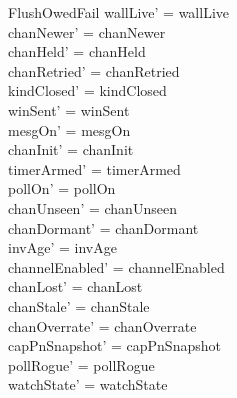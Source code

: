 \documentclass[a4paper,10pt,fleqn]{article}
\begin{document}
\begin{schema}{FlushOwedFail}
  wallLive' = wallLive \\
  chanNewer' = chanNewer \\
  chanHeld' = chanHeld \\
  chanRetried' = chanRetried \\
  kindClosed' = kindClosed \\
  winSent' = winSent \\
  mesgOn' = mesgOn \\
  chanInit' = chanInit \\
  timerArmed' = timerArmed \\
  pollOn' = pollOn \\
  chanUnseen' = chanUnseen \\
  chanDormant' = chanDormant \\
  invAge' = invAge \\
  channelEnabled' = channelEnabled \\
  chanLost' = chanLost \\
  chanStale' = chanStale \\
  chanOverrate' = chanOverrate \\
  capPnSnapshot' = capPnSnapshot \\
  pollRogue' = pollRogue \\
  watchState' = watchState
\end{schema}
\end{document}
